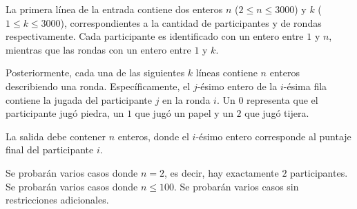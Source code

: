\documentclass{oci}
\begin{document}
\begin{inputDescription}
  La primera línea de la entrada contiene dos enteros $n$ ($2 \leq n \leq 3000$)
  y $k$ ($1 \leq k \leq 3000$), correspondientes a la cantidad de participantes y de
  rondas respectivamente.
  Cada participante es identificado con un entero entre $1$ y $n$, mientras que las rondas
  con un entero entre $1$ y $k$.

  Posteriormente, cada una de las siguientes $k$ líneas contiene $n$ enteros describiendo
  una ronda.
  Específicamente, el $j$-ésimo entero de la $i$-ésima fila contiene la jugada
  del participante $j$ en la ronda $i$.
  Un $0$ representa que el participante jugó piedra, un $1$ que jugó un papel y un $2$
  que jugó tijera.
\end{inputDescription}

\begin{outputDescription}
  La salida debe contener $n$ enteros, donde el $i$-ésimo entero corresponde al
  puntaje final del participante $i$.
\end{outputDescription}

\begin{scoreDescription}
   Se probarán varios casos donde $n = 2$, es decir, hay exactamente $2$ participantes.
   Se probarán varios casos donde $n \leq 100$.
   Se probarán varios casos sin restricciones adicionales.
\end{scoreDescription}

\begin{sampleDescription}
\end{sampleDescription}
\end{document}

